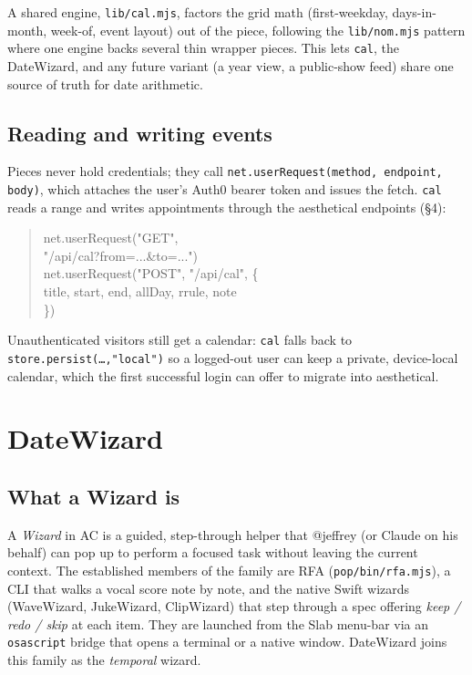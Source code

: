 \documentclass[10pt,letterpaper,twocolumn]{article}
\begin{document}
A shared engine, \texttt{lib/cal.mjs}, factors the grid math (first-weekday, days-in-month, week-of, event layout) out of the piece, following the \texttt{lib/nom.mjs} pattern where one engine backs several thin wrapper pieces. This lets \texttt{cal}, the DateWizard, and any future variant (a year view, a public-show feed) share one source of truth for date arithmetic.

\subsection{Reading and writing events}

Pieces never hold credentials; they call \texttt{net.userRequest(method, endpoint, body)}, which attaches the user's Auth0 bearer token and issues the fetch. \texttt{cal} reads a range and writes appointments through the aesthetical endpoints (\S4):

\begin{quote}\small\ttfamily
net.userRequest("GET",\\
\hspace*{1em}"/api/cal?from=...\&to=...")\\[0.4em]
net.userRequest("POST", "/api/cal", \{\\
\hspace*{1em}title, start, end, allDay, rrule, note\\
\})
\end{quote}

Unauthenticated visitors still get a calendar: \texttt{cal} falls back to \texttt{store.persist(\dots,"local")} so a logged-out user can keep a private, device-local calendar, which the first successful login can offer to migrate into aesthetical.

\section{DateWizard}

\subsection{What a Wizard is}

A \emph{Wizard} in AC is a guided, step-through helper that @jeffrey (or Claude on his behalf) can pop up to perform a focused task without leaving the current context. The established members of the family are RFA (\texttt{pop/bin/rfa.mjs}), a CLI that walks a vocal score note by note, and the native Swift wizards (WaveWizard, JukeWizard, ClipWizard) that step through a spec offering \emph{keep / redo / skip} at each item. They are launched from the Slab menu-bar via an \texttt{osascript} bridge that opens a terminal or a native window. DateWizard joins this family as the \emph{temporal} wizard.
\end{document}
